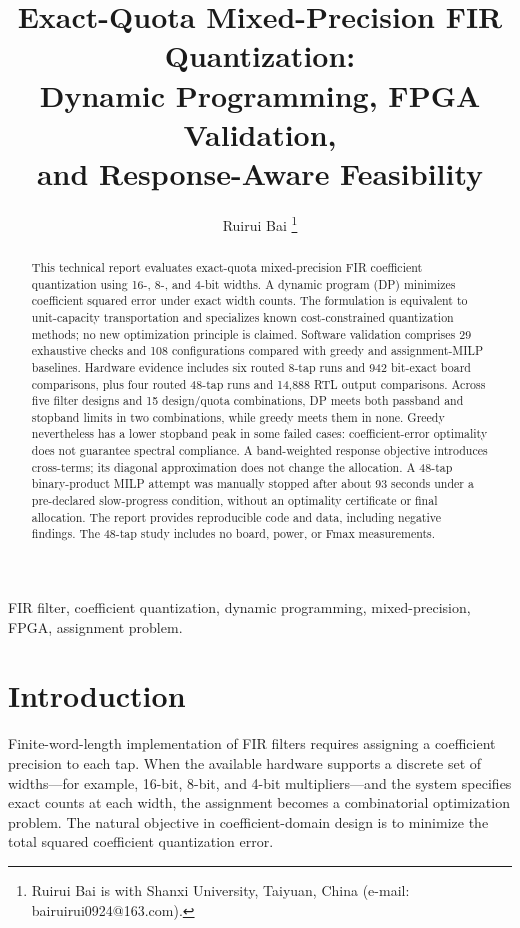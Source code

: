 \documentclass[journal]{IEEEtran}
\title{Exact-Quota Mixed-Precision FIR Quantization:\\
Dynamic Programming, FPGA Validation,\\
and Response-Aware Feasibility}
\author{Ruirui Bai%
\thanks{Ruirui Bai is with Shanxi University, Taiyuan, China (e-mail: bairuirui0924@163.com).}}
\begin{document}
\raggedbottom
\maketitle

\begin{abstract}
This technical report evaluates exact-quota mixed-precision FIR
coefficient quantization using 16-, 8-, and 4-bit widths. A dynamic
program (DP) minimizes coefficient squared error under exact width
counts. The formulation is equivalent to unit-capacity transportation
and specializes known cost-constrained quantization methods; no new
optimization principle is claimed. Software validation comprises 29
exhaustive checks and 108 configurations compared with greedy and
assignment-MILP baselines. Hardware evidence includes six routed 8-tap
runs and 942 bit-exact board comparisons, plus four routed 48-tap runs
and 14,888 RTL output comparisons. Across five filter designs and 15
design/quota combinations, DP meets both passband and stopband limits
in two combinations, while greedy meets them in none. Greedy nevertheless
has a lower stopband peak in some failed cases: coefficient-error
optimality does not guarantee spectral compliance. A band-weighted
response objective introduces cross-terms; its diagonal approximation
does not change the allocation. A 48-tap binary-product MILP attempt
was manually stopped after about 93 seconds under a pre-declared
slow-progress condition, without an optimality certificate or final
allocation. The report provides reproducible code and data, including
negative findings. The 48-tap study includes no board, power, or Fmax
measurements.
\end{abstract}

\begin{IEEEkeywords}
FIR filter, coefficient quantization, dynamic programming,
mixed-precision, FPGA, assignment problem.
\end{IEEEkeywords}

\section{Introduction}

Finite-word-length implementation of FIR filters requires assigning a
coefficient precision to each tap. When the available hardware supports
a discrete set of widths---for example, 16-bit, 8-bit, and 4-bit
multipliers---and the system specifies exact counts at each width, the
assignment becomes a combinatorial optimization problem. The natural
objective in coefficient-domain design is to minimize the total squared
coefficient quantization error.
\end{document}
